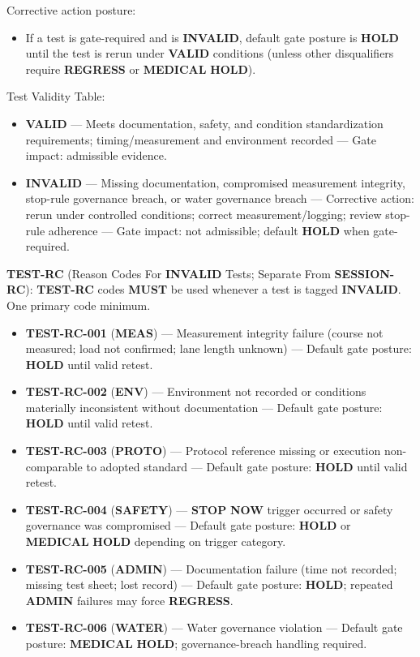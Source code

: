\documentclass[10pt]{article}
\begin{document}
Corrective action posture:

\begin{itemize}
\item If a test is gate-required and is \textbf{INVALID}, default gate posture is \textbf{HOLD} until the test is rerun under \textbf{VALID} conditions (unless other disqualifiers require \textbf{REGRESS} or \textbf{MEDICAL} \textbf{HOLD}).
\end{itemize}

Test Validity Table:

\begin{itemize}
\item \textbf{VALID} — Meets documentation, safety, and condition standardization requirements; timing/measurement and environment recorded — Gate impact: admissible evidence.
\item \textbf{INVALID} — Missing documentation, compromised measurement integrity, stop-rule governance breach, or water governance breach — Corrective action: rerun under controlled conditions; correct measurement/logging; review stop-rule adherence — Gate impact: not admissible; default \textbf{HOLD} when gate-required.
\end{itemize}

\textbf{TEST-RC} (Reason Codes For \textbf{INVALID} Tests; Separate From \textbf{SESSION-RC}):
\textbf{TEST-RC} codes \textbf{MUST} be used whenever a test is tagged \textbf{INVALID}. One primary code minimum.

\begin{itemize}
\item \textbf{TEST-RC-001} (\textbf{MEAS}) — Measurement integrity failure (course not measured; load not confirmed; lane length unknown) — Default gate posture: \textbf{HOLD} until valid retest.
\item \textbf{TEST-RC-002} (\textbf{ENV}) — Environment not recorded or conditions materially inconsistent without documentation — Default gate posture: \textbf{HOLD} until valid retest.
\item \textbf{TEST-RC-003} (\textbf{PROTO}) — Protocol reference missing or execution non-comparable to adopted standard — Default gate posture: \textbf{HOLD} until valid retest.
\item \textbf{TEST-RC-004} (\textbf{SAFETY}) — \textbf{STOP} \textbf{NOW} trigger occurred or safety governance was compromised — Default gate posture: \textbf{HOLD} or \textbf{MEDICAL} \textbf{HOLD} depending on trigger category.
\item \textbf{TEST-RC-005} (\textbf{ADMIN})  — Documentation failure (time not recorded; missing test sheet; lost record) — Default gate posture: \textbf{HOLD}; repeated \textbf{ADMIN} failures may force \textbf{REGRESS}.
\item \textbf{TEST-RC-006} (\textbf{WATER}) — Water governance violation — Default gate posture: \textbf{MEDICAL} \textbf{HOLD}; governance-breach handling required.
\end{itemize}
\end{document}
